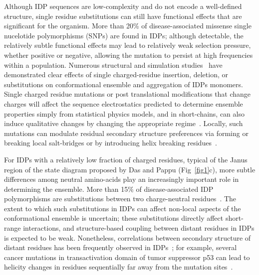 \documentclass[10pt,letterpaper]{article}
\begin{document}
Although IDP sequences are low-complexity and do not encode a well-defined structure, single residue substitutions can still have functional effects that are significant for the organism. More than 20\% of disease-associated missense single nucelotide polymorphisms (SNPs) are found in IDPs\cite{Vacic2012a}; although detectable, the relatively subtle functional effects may lead to relatively weak selection pressure, whether positive or negative, allowing the mutation to persist at high frequencies within a population. Numerous structural and simulation studies~\cite{Larini2013b,Ganguly2015,Viet2014a,Viet2013,Truong2014a,Zhan2013a,Xu2013a} have demonstrated clear effects of single charged-residue insertion, deletion, or substitutions on conformational ensemble and aggregation of IDPs monomers. Single charged residue mutations or post translational modifications that change charges will affect the sequence electrostatics predicted to determine ensemble properties simply from statistical physics models, and in short-chains, can also induce qualitative changes by changing the appropriate regime~\cite{Das2015,Larini2013b,Bah2016,He2015}. Locally, such mutations can modulate residual secondary structure preferences via forming or breaking local salt-bridges or by introducing helix breaking residues~\cite{AlexanderConicella2016,Ganguly2015,Zhan2013a}.  

For IDPs with a relatively low fraction of charged residues, typical of the Janus region of the state diagram proposed by Das and Pappu\cite{Das2015,Das2013a} (Fig~\ref{fig1}c), more subtle differences among neutral amino-acids play an increasingly important role in determining the ensemble. More than 15\% of disease-associated IDP polymorphisms are substitutions between two charge-neutral residues~\cite{Vacic2012a}. The extent to which such substitutions in IDPs can affect non-local aspects of the conformational ensemble is uncertain; these substitutions directly affect short-range interactions, and structure-based coupling between distant residues in IDPs is expected to be weak. Nonetheless, correlations between secondary structure of distant residues has been frequently observed in IDPs~\cite{Ganguly2015,Iesmantavicius2013}; for example, several cancer mutations in transactivation domain of tumor suppressor p53 can lead to helicity changes in residues sequentially far away from the mutation sites~\cite{Ganguly2015}.
\end{document}
